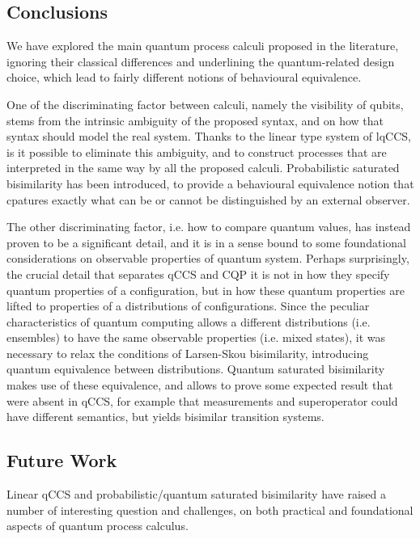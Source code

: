 \subsection*{Conclusions}
We have explored the main  quantum process calculi proposed in the literature, ignoring their classical differences and underlining the quantum-related design choice, which lead to fairly different notions of behavioural equivalence.

One of the discriminating factor between calculi, namely the visibility of qubits, stems from the intrinsic ambiguity of the proposed syntax, and on how that syntax should model the real system. Thanks to the linear type system of lqCCS, is it possible to eliminate this ambiguity, and to construct processes that are interpreted in the same way by all the proposed calculi. Probabilistic saturated bisimilarity has been introduced, to provide a behavioural equivalence notion that cpatures exactly what can  be or cannot be distinguished by an external observer.

The other discriminating factor, i.e. how to compare quantum values, has instead proven to be a significant detail, and it is in a sense bound to some foundational considerations on observable properties of quantum system. Perhaps surprisingly, the crucial detail that separates qCCS and CQP it is not in how they specify quantum properties of a configuration, but in how these quantum properties are lifted to properties of a distributions of configurations. Since the peculiar characteristics of quantum computing allows a different distributions (i.e. ensembles) to have the same observable properties (i.e. mixed states), it was necessary to relax the conditions of Larsen-Skou bisimilarity, introducing quantum equivalence between distributions. Quantum saturated bisimilarity makes use of these equivalence, and allows to prove some expected result that were absent in qCCS, for example that measurements and superoperator could have different semantics, but yields bisimilar transition systems. 
\subsection*{Future Work}
Linear qCCS and probabilistic/quantum saturated bisimilarity have raised a number of interesting question and challenges, on both practical and foundational aspects of quantum process calculus.

